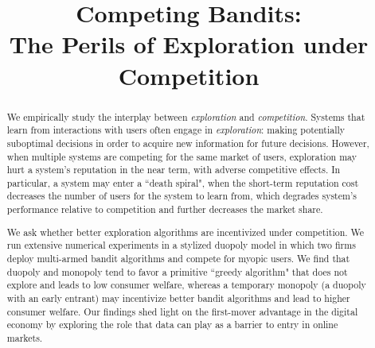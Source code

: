 \documentclass[format=acmsmall, review=false]{acmart}
\theoremstyle{definition}
\begin{document}
\title[Competing Bandits: The Perils of Exploration under Competition]
{Competing Bandits: \\ The Perils of Exploration under Competition}



\begin{abstract}
  We empirically study the interplay between \textit{exploration} and
  \textit{competition}. Systems that learn from interactions with
  users often engage in \emph{exploration}: making potentially
  suboptimal decisions in order to acquire new information for future
  decisions. However, when multiple systems are competing for
    the same market of users, exploration may hurt a system's
    reputation in the near term, with adverse competitive effects. In particular, a system may enter a ``death spiral", when the short-term reputation cost decreases
    the number of users for the system to learn from, which degrades
    system's performance relative to competition and further decreases
    the market share.

We ask whether better exploration algorithms are incentivized under competition. We run extensive numerical experiments in a stylized duopoly model in which two firms deploy multi-armed bandit algorithms and compete for myopic users.  We find that duopoly and monopoly tend to favor a primitive ``greedy algorithm" that does not explore and leads to low consumer welfare, whereas a temporary monopoly (a duopoly with an early entrant) may incentivize better bandit algorithms and lead to higher consumer welfare. Our findings shed light on the first-mover advantage in the digital economy by exploring the role that data can play as a barrier to entry in online markets.
\end{abstract}

%
%
\maketitle
{}



\newpage





















\end{document}
